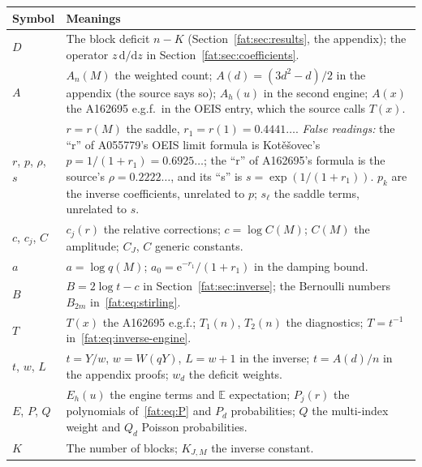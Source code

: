 \documentclass[11pt,letterpaper]{article}
\numberwithin{equation}{section}
\theoremstyle{remark}\newtheorem{remark}[theorem]{Remark}
\newcommand{\E}{\mathbb E}\newcommand{\Prob}{\mathbb P}\newcommand{\ee}{\mathrm e}
\begin{document}
\noindent\begin{tabular}{@{}>{\raggedright\arraybackslash}p{0.8in}>{\raggedright\arraybackslash}p{5.4in}@{}}
\toprule
Symbol & Meanings\\
\midrule
$D$ & The block deficit $n-K$ (Section~\ref{fat:sec:results}, the appendix); the operator $z\,\mathrm d/\mathrm dz$ in Section~\ref{fat:sec:coefficients}.\\
$A$ & $A_n(M)$ the weighted count; $A(d)=(3d^2-d)/2$ in the appendix (the source says so); $A_h(u)$ in the second engine; $A(x)$ the A162695 e.g.f.\ in the OEIS entry, which the source calls $T(x)$.\\
$r$, $p$, $\rho$, $s$ & $r=r(M)$ the saddle, $r_1=r(1)=0.4441\ldots$. \emph{False readings:} the ``r'' of A055779's OEIS limit formula is Kot\v{e}\v{s}ovec's $p=1/(1+r_1)=0.6925\ldots$; the ``r'' of A162695's formula is the source's $\rho=0.2222\ldots$, and its ``s'' is $s=\exp(1/(1+r_1))$. $p_k$ are the inverse coefficients, unrelated to $p$; $s_\ell$ the saddle terms, unrelated to $s$.\\
$c$, $c_j$, $C$ & $c_j(r)$ the relative corrections; $c=\log C(M)$; $C(M)$ the amplitude; $C_J$, $C$ generic constants.\\
$a$ & $a=\log q(M)$; $a_0=\ee^{-r_1}/(1+r_1)$ in the damping bound.\\
$B$ & $B=2\log t-c$ in Section~\ref{fat:sec:inverse}; the Bernoulli numbers $B_{2m}$ in~\eqref{fat:eq:stirling}.\\
$T$ & $T(x)$ the A162695 e.g.f.; $T_1(n)$, $T_2(n)$ the diagnostics; $T=t^{-1}$ in~\eqref{fat:eq:inverse-engine}.\\
$t$, $w$, $L$ & $t=Y/w$, $w=W(qY)$, $L=w+1$ in the inverse; $t=A(d)/n$ in the appendix proofs; $w_d$ the deficit weights.\\
$E$, $P$, $Q$ & $E_h(u)$ the engine terms and $\E$ expectation; $P_j(r)$ the polynomials of~\eqref{fat:eq:P} and $P_d$ probabilities; $Q$ the multi-index weight and $Q_d$ Poisson probabilities.\\
$K$ & The number of blocks; $K_{J,M}$ the inverse constant.\\
\bottomrule
\end{tabular}
\endgroup
\end{document}
